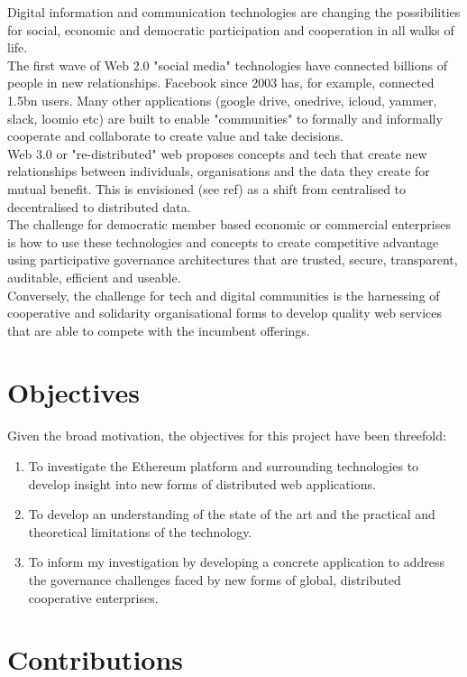 Digital information and communication technologies are changing the possibilities for social, economic and democratic participation and cooperation in all walks of life.\\

The first wave of Web 2.0 "social media" technologies have connected billions of people in new relationships. Facebook since 2003 has, for example, connected 1.5bn users. Many other applications (google drive, onedrive, icloud, yammer, slack, loomio etc) are built to enable "communities" to formally and informally cooperate and collaborate to create value and take decisions.\\

Web 3.0 or "re-distributed" web proposes concepts and tech that create new relationships between individuals, organisations and the data they create for mutual benefit. This is envisioned (see ref) as a shift from centralised to decentralised to distributed data.\\

The challenge for democratic member based economic or commercial enterprises is how to use these technologies and concepts to create competitive advantage using participative governance architectures that are trusted, secure, transparent, auditable, efficient and useable. \\

Conversely, the challenge for tech and digital communities is the harnessing of cooperative and solidarity organisational forms to develop quality web services that are able to compete with the incumbent offerings. \\

\section{Objectives}
Given the broad motivation, the objectives for this project have been threefold:
\begin{enumerate}
\item To investigate the Ethereum platform and surrounding technologies to develop insight into new forms of distributed web applications.
\item To develop an understanding of the state of the art and the practical and theoretical limitations of the technology.
\item To inform my investigation by developing a concrete application to address the governance challenges faced by new forms of global, distributed cooperative enterprises.
\end{enumerate}

\section{Contributions}

